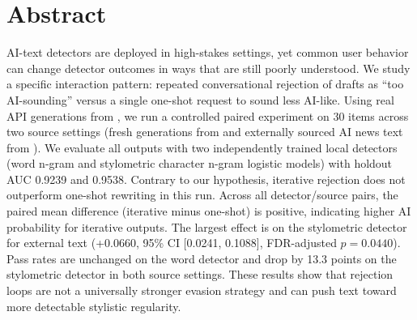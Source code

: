 \section*{Abstract}
AI-text detectors are deployed in high-stakes settings, yet common user behavior can change detector outcomes in ways that are still poorly understood. We study a specific interaction pattern: repeated conversational rejection of drafts as ``too AI-sounding'' versus a single one-shot request to sound less AI-like. Using real API generations from \gptmini, we run a controlled paired experiment on 30 items across two source settings (fresh generations from \hcthree and externally sourced AI news text from \ghostbuster). We evaluate all outputs with two independently trained local detectors (word n-gram and stylometric character n-gram logistic models) with holdout AUC 0.9239 and 0.9538. Contrary to our hypothesis, iterative rejection does not outperform one-shot rewriting in this run. Across all detector/source pairs, the paired mean difference (iterative minus one-shot) is positive, indicating higher AI probability for iterative outputs. The largest effect is on the stylometric detector for external text (+0.0660, 95\% CI [0.0241, 0.1088], FDR-adjusted $p=0.0440$). Pass rates are unchanged on the word detector and drop by 13.3 points on the stylometric detector in both source settings. These results show that rejection loops are not a universally stronger evasion strategy and can push text toward more detectable stylistic regularity.
